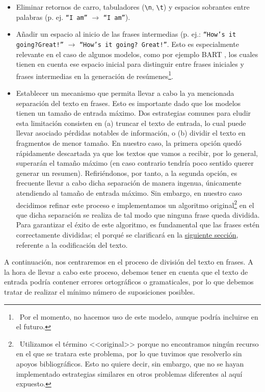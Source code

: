 \begin{itemize}
	\item [\textbullet] Eliminar retornos de carro, tabuladores (\texttt{\textbackslash n}, \texttt{\textbackslash t}) y espacios sobrantes entre palabras (p. ej. \texttt{``I \quad am''} $\rightarrow$ \texttt{``I am''}).
	
	\item [\textbullet] Añadir un espacio al inicio de las frases intermedias (p. ej.: \texttt{``How's it going?Great!''} $\rightarrow$ \texttt{``How's it going? Great!''}. Esto es especialmente relevante en el caso de algunos modelos, como por ejemplo BART \cite{lewis19}, los cuales tienen en cuenta ese espacio inicial para distinguir entre frases iniciales y frases intermedias en la generación de resúmenes\footnote{\, Por el momento, no hacemos uso de este modelo, aunque podría incluirse en el futuro.}.
	
	\item [\textbullet] Establecer un mecanismo que permita llevar a cabo la ya mencionada separación del texto en frases. Esto es importante dado que los modelos tienen un tamaño de entrada máximo. Dos estrategias comunes para eludir esta limitación consisten en (a) truncar el texto de entrada, lo cual puede llevar asociado pérdidas notables de información, o (b) dividir el texto en fragmentos de menor tamaño. En nuestro caso, la primera opción quedó rápidamente descartada ya que los textos que vamos a recibir, por lo general, superarán el tamaño máximo (en caso contrario tendría poco sentido querer generar un resumen). Refiriéndonos, por tanto, a la segunda opción, es frecuente llevar a cabo dicha separación de manera ingenua, únicamente atendiendo al tamaño de entrada máximo. Sin embargo, en nuestro caso decidimos refinar este proceso e implementamos un algoritmo original\footnote{\, Utilizamos el término <<original>> porque no encontramos ningún recurso en el que se tratara este problema, por lo que tuvimos que resolverlo sin apoyos bibliográficos. Esto no quiere decir, sin embargo, que no se hayan implementado estrategias similares en otros problemas diferentes al aquí expuesto.} en el que dicha separación se realiza de tal modo que ninguna frase queda dividida. Para garantizar el éxito de este algoritmo, es fundamental que las frases estén correctamente divididas; el porqué se clarificará en la \hyperref[sec:codificacion]{siguiente sección}, referente a la codificación del texto.
\end{itemize}

A continuación, nos centraremos en el proceso de división del texto en frases. A la hora de llevar a cabo este proceso, debemos tener en cuenta que el texto de entrada podría contener errores ortográficos o gramaticales, por lo que debemos tratar de realizar el mínimo número de suposiciones posibles.

